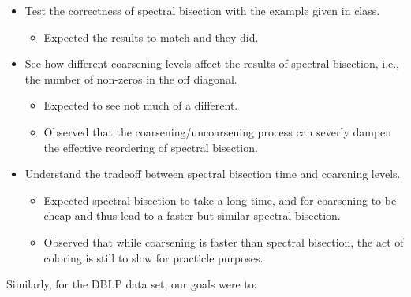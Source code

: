 \documentclass[11pt]{article}
\newcommand{\noi}{\noindent}
\begin{document}
\begin{itemize}
	\item Test the correctness of spectral bisection with the example given in
		class. 
		\begin{itemize}
			\item Expected the results to match and they did.
		\end{itemize}
	\item See how different coarsening levels affect the results of spectral bisection,
		i.e., the number of non-zeros in the off diagonal. 
		\begin{itemize}
			\item Expected to see not much of a different. 
			\item Observed that the coarsening/uncoarsening process can
				severly dampen the effective reordering of
				spectral bisection.
		\end{itemize}
	\item Understand the tradeoff between spectral bisection time and
		coarening levels. 
		\begin{itemize}
			\item Expected spectral bisection to take a long time,
				and for coarsening to be cheap and thus lead to
				a faster but similar spectral bisection. 
			\item Observed that while coarsening is faster than
				spectral bisection, the act of coloring is still
				to slow for practicle purposes.
		\end{itemize}
\end{itemize}
\noi Similarly, for the DBLP data set, our goals were to: 
\end{document}
